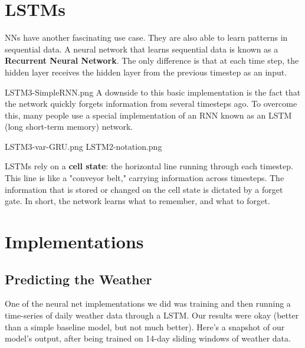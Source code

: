 \documentclass[]{article}
\begin{document}
\section{LSTMs}

NNs have another fascinating use case. They are also able to learn patterns in sequential data. A neural network that learns sequential data is known as a \textbf{Recurrent Neural Network}. The only difference is that at each time step, the hidden layer receives the hidden layer from the previous timestep as an input.

  LSTM3-SimpleRNN.png
A downside to this basic implementation is the fact that the network quickly forgets information from several timesteps ago. To overcome this, many people use a special implementation of an RNN known as an LSTM (long short-term memory) network.

  LSTM3-var-GRU.png
  LSTM2-notation.png
  
LSTMs rely on a \textbf{cell state}: the horizontal line running through each timestep. This line is like a "conveyor belt," carrying information across timesteps. The information that is stored or changed on the cell state is dictated by a forget gate. In short, the network learns what to remember, and what to forget.

\section{Implementations}

\subsection{Predicting the Weather}

One of the neural net implementations we did was training and then running a time-series of daily weather data through a LSTM. Our results were okay (better than a simple baseline model, but not much better). Here's a snapshot of our model's output, after being trained on 14-day sliding windows of weather data.
\end{document}
